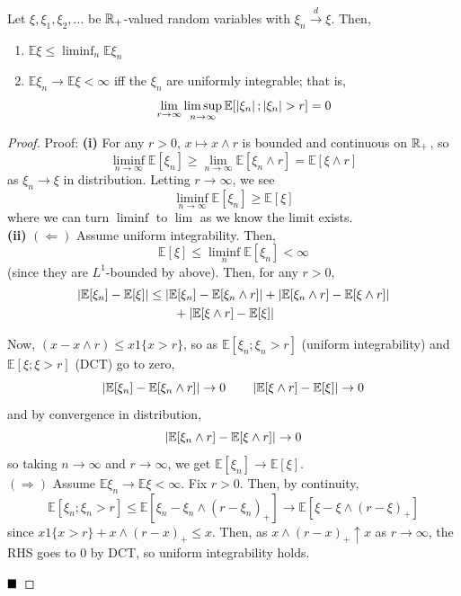 \begin{lemma}
    Let $\xi, \xi_1, \xi_2, \ldots$ be $\mathbb{R}_{+}$-valued random variables with $\xi_n \xrightarrow{d} \xi$. Then,
    \begin{enumerate}[label = (\roman*)]
        \item $\mathbb{E}\xi \leq \liminf_{n} \mathbb{E}\xi_n$
        \item $\mathbb{E}\xi_n \to \mathbb{E}\xi < \infty$ iff the $\xi_n$ are uniformly integrable; that is,
        \[ \lim_{r \to \infty} \limsup_{n \to \infty} \mathbb{E}[\left\lvert {\xi_n} \right\rvert ; \left\lvert {\xi_n} \right\rvert > r] = 0 \]
    \end{enumerate}
\end{lemma}
\begin{proof}{Proof:}
    \textbf{(i)} For any $r > 0$, $x \mapsto x \wedge r$ is bounded and continuous on $\mathbb{R}_{+}$, so
    \[ \liminf_{n \to \infty} \mathbb{E}[\xi_n] \geq \lim_{n \to \infty} \mathbb{E}[\xi_n \wedge r] = \mathbb{E}[\xi \wedge r] \]
    as $\xi_n \to \xi$ in distribution. Letting $r \to \infty$, we see
    \[ \liminf_{n \to \infty} \mathbb{E}[\xi_n] \geq \mathbb{E}[\xi] \]
    where we can turn $\liminf$ to $\lim$ as we know the limit exists.\\

    \textbf{(ii)} $(\Leftarrow)$ Assume uniform integrability. Then,
    \[ \mathbb{E}[\xi] \leq \liminf_{n} \mathbb{E}[\xi_n] < \infty \]
    (since they are $L^1$-bounded by above). Then, for any $r > 0$,
    \begin{align*}
        \left\lvert {\mathbb{E}[\xi_n] - \mathbb{E}[\xi]} \right\rvert &\leq \left\lvert {\mathbb{E}[\xi_n] - \mathbb{E}[\xi_n \wedge r]} \right\rvert + \left\lvert {\mathbb{E}[\xi_n \wedge r] - \mathbb{E}[\xi \wedge r]} \right\rvert\\
        &\qquad + \left\lvert {\mathbb{E}[\xi \wedge r] - \mathbb{E}[\xi]} \right\rvert
    \end{align*}

    Now, $(x - x \wedge r) \leq x1\{x > r\}$, so as $\mathbb{E}[\xi_n ; \xi_n > r]$ (uniform integrability) and $\mathbb{E}[\xi ; \xi > r]$ (DCT) go to zero,
    \[ \left\lvert {\mathbb{E}[\xi_n] - \mathbb{E}[\xi_n \wedge r]} \right\rvert \to 0 \qquad \left\lvert {\mathbb{E}[\xi \wedge r] - \mathbb{E}[\xi]} \right\rvert \to 0 \]
    and by convergence in distribution,
    \[ \left\lvert {\mathbb{E}[\xi_n \wedge r] - \mathbb{E}[\xi \wedge r]} \right\rvert \to 0 \]
    so taking $n \to \infty$ and $r \to \infty$, we get $\mathbb{E}[\xi_n] \to \mathbb{E}[\xi]$.\\

    $(\Rightarrow)$ Assume $\mathbb{E}\xi_n \to \mathbb{E}\xi < \infty$. Fix $r > 0$. Then, by continuity,
    \[ \mathbb{E}[\xi_n ; \xi_n > r] \leq \mathbb{E}[\xi_n - \xi_n \wedge (r - \xi_n)_{+}] \to \mathbb{E}[\xi - \xi \wedge (r - \xi)_{+}] \]
    since $x1\{x > r\} + x \wedge (r - x)_{+} \leq x$. Then, as $x \wedge (r - x)_{+} \uparrow x$ as $r \to \infty$, the RHS goes to $0$ by DCT, so uniform integrability holds.

    $\qed$
\end{proof}
